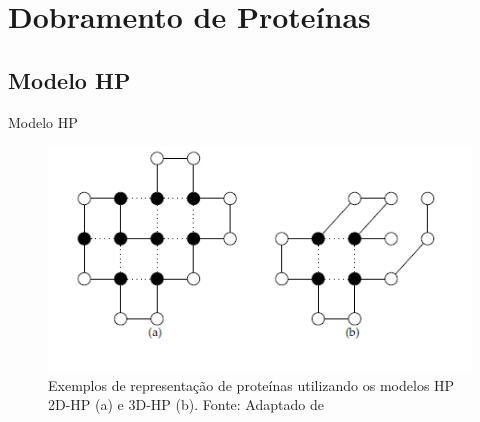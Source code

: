 \section{Dobramento de Proteínas}

\subsection{Modelo HP}
\begin{frame}{Modelo HP}

	
		
		
		\begin{figure}[!htb]
			\centering
			\includegraphics[scale=.8]{figuras/modeloHPExemplo.png}
			\caption{Exemplos de representação de proteínas utilizando os modelos HP 2D-HP (a) e 3D-HP (b). Fonte: Adaptado de \cite{santanna2008} }
			\label{fig:exemploModeloHP}
		\end{figure}

\end{frame}



